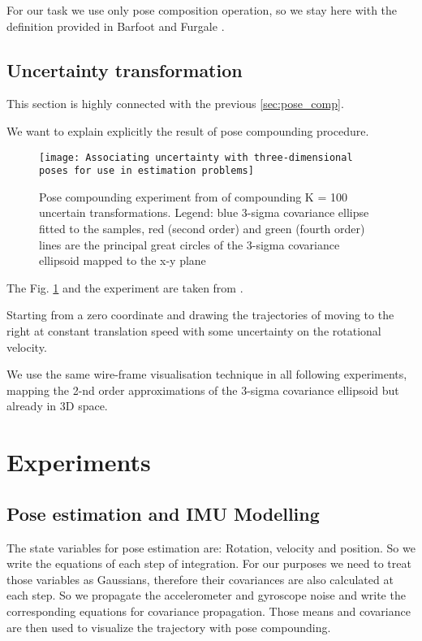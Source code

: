\documentclass{article}
\begin{document}
For our task we use only pose composition operation, so we stay here with the definition provided in Barfoot and Furgale \cite{Barfoot}.

\subsection{Uncertainty transformation}\label{sec:unc_transform}

This section is highly connected with the previous \ref{sec:pose_comp}.

We want to explain explicitly the result of pose compounding procedure.

\begin{figure}
	\texttt{[image: Associating uncertainty with three-dimensional poses for use in estimation problems]}
	
	\caption{Pose compounding experiment from \cite{Barfoot} of compounding K = 100 uncertain transformations. Legend: blue 3-sigma covariance ellipse fitted to the samples, red (second order) and green (fourth order) lines are the principal great circles of the 3-sigma covariance ellipsoid mapped to the x-y plane}
	\label{comp_barfoot}
\end{figure}

The Fig. \ref{comp_barfoot} and the experiment are taken from \cite{Barfoot}. 

Starting from a zero coordinate and drawing the trajectories of moving to the right at constant translation speed with some uncertainty on the rotational velocity. 

We use the same wire-frame visualisation technique in all following experiments, mapping the 2-nd order approximations of the 3-sigma covariance ellipsoid but already in 3D space.



\section{Experiments}

\subsection{Pose estimation and IMU Modelling}

The state variables for pose estimation are: Rotation, velocity and position. So we write the equations of each step of integration. For our purposes we need to treat those variables as Gaussians, therefore their covariances are also calculated at each step. So we propagate the accelerometer and gyroscope noise and write the corresponding equations for covariance propagation. Those means and covariance are then used to visualize the trajectory with pose compounding.
\end{document}
